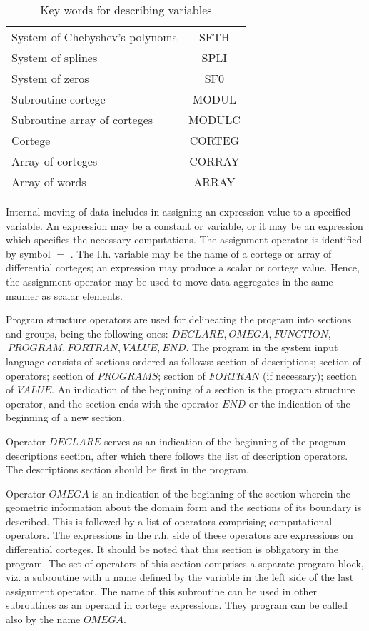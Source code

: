 {\begin{table}
\begin{center}
\begin{tabular}{|l|c|}
     System of Chebyshev's polynoms              & SFTH    \\
     System of splines                           & SPLI    \\
     System of zeros                             & SF0     \\ \hline
     Subroutine cortege                          & MODUL   \\
     Subroutine array of corteges                & MODULC  \\ \hline
     Cortege                                     & CORTEG  \\
     Array of corteges                           & CORRAY  \\
     Array of words                              & ARRAY   \\ \hline
  \end{tabular}
  \end{center}
  \caption{Key words for describing variables\label{t2}}
\end{table}}

Internal moving of data includes in assigning an expression value to a
specified variable. An expression may be a constant or variable, or it may
be an expression which specifies the necessary computations. The assignment
operator is identified by symbol $=$ . The l.h. variable may be the name of
a cortege or array of differential corteges; an expression may produce a
scalar or cortege value. Hence, the assignment operator may be used to move
data aggregates in the same manner as scalar elements.

Program structure operators are used for delineating the program into
sections and groups, being the following ones: $DECLARE$,$\ OMEGA$,$\
FUNCTION$,$\ PROGRAM$,$\ FORTRAN$,$\ VALUE$,$\ END$. The program in the
system input language consists of sections ordered as follows: section of
descriptions; section of operators; section of $PROGRAMS$; section of $%
FORTRAN$ (if necessary); section of $VALUE$. An indication of the beginning
of a section is the program structure operator, and the section ends with
the operator $END$ or the indication of the beginning of a new section.

Operator $DECLARE$ serves as an indication of the beginning of the program
descriptions section, after which there follows the list of description
operators. The descriptions section should be first in the program.

Operator $OMEGA$ is an indication of the beginning of the section wherein
the geometric information about the domain form and the sections of its
boundary is described. This is followed by a list of operators comprising
computational operators. The expressions in the r.h. side of these operators
are expressions on differential corteges. It should be noted that this
section is obligatory in the program. The set of operators of this section
comprises a separate program block, viz. a subroutine with a name defined by
the variable in the left side of the last assignment operator. The name of
this subroutine can be used in other subroutines as an operand in cortege
expressions. They program can be called also by the name $OMEGA$.

